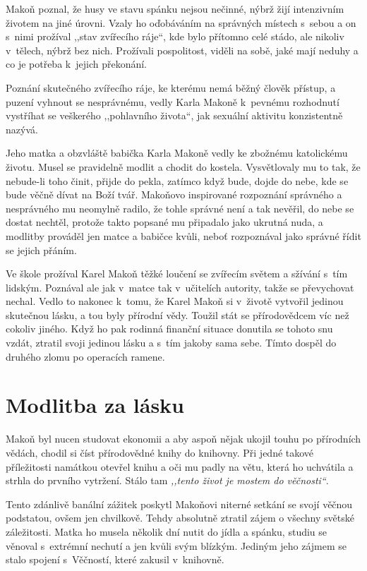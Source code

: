 Makoň poznal, že husy ve stavu spánku nejsou nečinné, nýbrž žijí intenzivním
životem na jiné úrovni. Vzaly ho oďobáváním na správných místech s~sebou a on
s~nimi prožíval ,,stav zvířecího ráje``, kde bylo přítomno celé stádo, ale
nikoliv v~tělech, nýbrž bez nich. Prožívali pospolitost, viděli na sobě, jaké
mají neduhy a co je potřeba k~jejich překonání.

Poznání skutečného zvířecího ráje, ke kterému nemá běžný člověk přístup, a
puzení vyhnout se nesprávnému, vedly Karla Makoně k~pevnému rozhodnutí vystříhat
se veškerého ,,pohlavního života``, jak sexuální aktivitu konzistentně nazývá.

Jeho matka a obzvláště babička Karla Makoně vedly ke zbožnému katolickému
životu. Musel se pravidelně modlit a chodit do kostela. Vysvětlovaly mu to tak,
že nebude-li toho činit, přijde do pekla, zatímco když bude, dojde do nebe, kde
se bude věčně dívat na Boží tvář. Makoňovo inspirované rozpoznání správného a
nesprávného mu neomylně radilo, že tohle správné není a tak nevěřil, do nebe se
dostat nechtěl, protože takto popsané mu připadalo jako ukrutná nuda, a modlitby
prováděl jen matce a babičce kvůli, neboť rozpoznával jako správné řídit se
jejich přáním.

Ve škole prožíval Karel Makoň těžké loučení se zvířecím světem a sžívání s~tím
lidským. Poznával ale jak v~matce tak v~učitelích autority, takže se převychovat
nechal. Vedlo to nakonec k~tomu, že Karel Makoň si v~životě vytvořil jedinou
skutečnou lásku, a tou byly přírodní vědy. Toužil stát se přírodovědcem víc než
cokoliv jiného. Když ho pak rodinná finanční situace donutila se tohoto snu
vzdát, ztratil svoji jedinou lásku a s~tím jakoby sama sebe.
Tímto dospěl do druhého zlomu po operacích ramene.

\section{Modlitba za lásku}

Makoň byl nucen studovat ekonomii a aby aspoň nějak ukojil touhu po přírodních
vědách, chodil si číst přírodovědné knihy do knihovny. Při jedné takové
příležitosti namátkou otevřel knihu a oči mu padly na větu, která ho uchvátila a
strhla do prvního vytržení. Stálo tam \textit{,,tento život je mostem do
věčnosti``}.

Tento zdánlivě banální zážitek poskytl Makoňovi niterné setkání se svojí věčnou
podstatou, ovšem jen chvilkově. Tehdy absolutně ztratil zájem o všechny světské
záležitosti. Matka ho musela několik dní nutit do jídla a spánku, studiu se
věnoval s~extrémní nechutí a jen kvůli svým blízkým. Jediným jeho zájmem se
stalo spojení s~Věčností, které zakusil v~knihovně.

